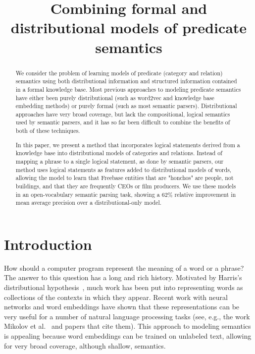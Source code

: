 \documentclass[11pt]{article}
\title{Combining formal and distributional models of predicate semantics}
\author{}%
\date{}
\begin{document}
\maketitle

\begin{abstract}

  We consider the problem of learning models of predicate (category and
  relation) semantics using both distributional information and structured
  information contained in a formal knowledge base.  Most previous approaches
  to modeling predicate semantics have either been purely distributional (such
  as word2vec and knowledge base embedding methods) or purely formal (such as
  most semantic parsers).  Distributional approaches have very broad coverage,
  but lack the compositional, logical semantics used by semantic parsers, and
  it has so far been difficult to combine the benefits of both of these
  techniques.

  In this paper, we present a method that incorporates logical statements
  derived from a knowledge base into distributional models of categories and
  relations.  Instead of mapping a phrase to a single logical statement, as
  done by semantic parsers, our method uses logical statements as features
  added to distributional models of words, allowing the model to learn that
  Freebase entities that are "honchos" are people, not buildings, and that they
  are frequently CEOs or film producers.  We use these models in an
  open-vocabulary semantic parsing task, showing a 62\% relative improvement in
  mean average precision over a distributional-only model.

\end{abstract}

\section{Introduction}

How should a computer program represent the meaning of a word or a phrase?  The
answer to this question has a long and rich history.  Motivated by Harris's
distributional hypothesis~\cite{harris-1954-distributional-hypothesis}, much
work has been put into representing words as collections of the contexts in
which they appear.  Recent work with neural networks and word embeddings have
shown that these representations can be very useful for a number of natural
language processing tasks (see, e.g., the work Mikolov et
al.~ and papers that cite them).  This
approach to modeling semantics is appealing because word embeddings can be
trained on unlabeled text, allowing for very broad coverage, although shallow,
semantics.
\end{document}
